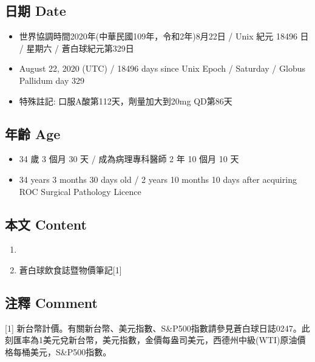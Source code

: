 \documentclass[a5paper, 11pt
]{book}
\providecommand{\tightlist}{%
  \setlength{\itemsep}{0pt}\setlength{\parskip}{0pt}}
\begin{document}
\hypertarget{ux65e5ux671f-date-82}{%
\subsection{日期 Date}\label{ux65e5ux671f-date-82}}

\begin{itemize}
\tightlist
\item
  世界協調時間2020年(中華民國109年，令和2年)8月22日 / Unix 紀元 18496 日
  / 星期六 / 蒼白球紀元第329日
\item
  August 22, 2020 (UTC) / 18496 days since Unix Epoch / Saturday /
  Globus Pallidum day 329
\item
  特殊註記: 口服A酸第112天，劑量加大到20mg QD第86天
\end{itemize}

\hypertarget{ux5e74ux9f61-age-82}{%
\subsection{年齡 Age}\label{ux5e74ux9f61-age-82}}

\begin{itemize}
\tightlist
\item
  34 歲 3 個月 30 天 / 成為病理專科醫師 2 年 10 個月 10 天
\item
  34 years 3 months 30 days old / 2 years 10 months 10 days after
  acquiring ROC Surgical Pathology Licence
\end{itemize}

\hypertarget{ux672cux6587-content-82}{%
\subsection{本文 Content}\label{ux672cux6587-content-82}}

\begin{enumerate}
\def\labelenumi{\arabic{enumi}.}
\tightlist
\item
\item
  蒼白球飲食誌暨物價筆記{[}1{]}
\end{enumerate}

\hypertarget{ux6ce8ux91cb-comment-82}{%
\subsection{注釋 Comment}\label{ux6ce8ux91cb-comment-82}}

{[}1{]}
新台幣計價。有關新台幣、美元指數、S\&P500指數請參見蒼白球日誌0247。此刻匯率為1美元兌新台幣，美元指數，金價每盎司美元，西德州中級(WTI)原油價格每桶美元，S\&P500指數。
\end{document}
